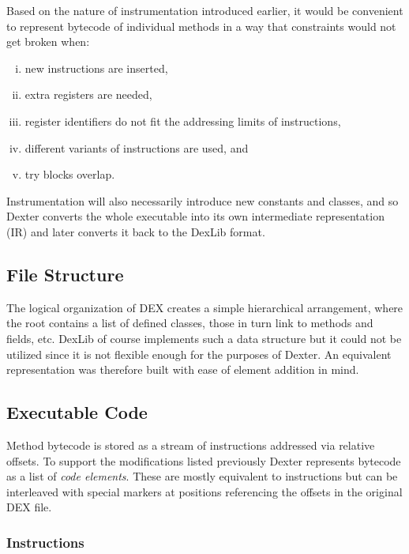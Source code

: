 \documentclass[12pt,twoside,notitlepage]{report}
\begin{document}
Based on the nature of instrumentation introduced earlier, it would be convenient to represent bytecode of individual methods in a way that constraints would not get broken when:
\begin{enumerate}[(i)]
\item new instructions are inserted,
\item extra registers are needed,
\item register identifiers do not fit the addressing limits of instructions,
\item different variants of instructions are used, and
\item try blocks overlap.
\end{enumerate}
Instrumentation will also necessarily introduce new constants and classes, and so Dexter converts the whole executable into its own intermediate representation (IR) and later converts it back to the DexLib format.

\subsection{File Structure}

The logical organization of DEX creates a simple hierarchical arrangement, where the root contains a list of defined classes, those in turn link to methods and fields, etc. DexLib of course implements such a data structure but it could not be utilized since it is not flexible enough for the purposes of Dexter. An equivalent representation was therefore built with ease of element addition in mind.


\subsection{Executable Code}

Method bytecode is stored as a stream of instructions addressed via relative offsets. To support the modifications listed previously Dexter represents bytecode as a list of \emph{code elements}. These are mostly equivalent to instructions but can be interleaved with special markers at positions referencing the offsets in the original DEX file.

\subsubsection{Instructions}
\end{document}
